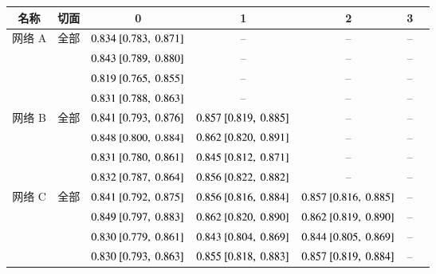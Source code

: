 \renewcommand{\captiontitle}{网络性能评估}
\begin{sidewaystable*}
\begin{center}
\begin{tabular}{ccccccc} \hline
\toprule
名称      & 切面   & \UNet{} 0                 & \UNet{} 1                 & \UNet{} 2                 & \UNet{} 3                 \\
\midrule
网络 A & 全部    & $0.834~[0.783,~0.871]$ & --                        & --                        & --                        \\
          & \SA{}  & $0.843~[0.789,~0.880]$ & --                        & --                        & --                        \\
          & \HLA{} & $0.819~[0.765,~0.855]$ & --                        & --                        & --                        \\
          & \VLA{} & $0.831~[0.788,~0.863]$ & --                        & --                        & --                        \\
\midrule
网络 B & 全部    & $0.841~[0.793,~0.876]$ & $0.857~[0.819,~0.885]$ & --                        & --                        \\
          & \SA{}  & $0.848~[0.800,~0.884]$ & $0.862~[0.820,~0.891]$ & --                        & --                        \\
          & \HLA{} & $0.831~[0.780,~0.861]$ & $0.845~[0.812,~0.871]$ & --                        & --                        \\
          & \VLA{} & $0.832~[0.787,~0.864]$ & $0.856~[0.822,~0.882]$ & --                        & --                        \\
\midrule
网络 C & 全部    & $0.841~[0.792,~0.875]$ & $0.856~[0.816,~0.884]$ & $0.857~[0.816,~0.885]$ & --                        \\
          & \SA{}  & $0.849~[0.797,~0.883]$ & $0.862~[0.820,~0.890]$ & $0.862~[0.819,~0.890]$ & --                        \\
          & \HLA{} & $0.830~[0.779,~0.861]$ & $0.843~[0.804,~0.869]$ & $0.844~[0.805,~0.869]$ & --                        \\
          & \VLA{} & $0.830~[0.793,~0.863]$ & $0.855~[0.818,~0.883]$ & $0.857~[0.819,~0.884]$ & --                        \\

\end{tabular}
\end{center}
\end{sidewaystable*}
